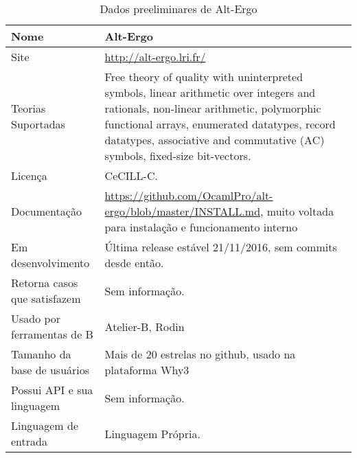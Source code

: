 \begin{table}[!h]
  \centering
  \begin{tabular}{ | l | p{10cm} |}
    \hline
	Nome & Alt-Ergo \\ \hline
    Site & \url{http://alt-ergo.lri.fr/} \\ \hline 
    Teorias Suportadas & Free theory of quality with uninterpreted symbols, linear arithmetic over integers and rationals, non-linear arithmetic, polymorphic functional arrays, enumerated datatypes, record datatypes, associative and commutative (AC) symbols, fixed-size bit-vectors.\\ \hline
    Licença & CeCILL-C. \\ \hline
    Documentação & \url{https://github.com/OcamlPro/alt-ergo/blob/master/INSTALL.md}, muito voltada para instalação e funcionamento interno \\ \hline
    Em desenvolvimento & Última release estável 21/11/2016, sem commits desde então. \\ \hline
    Retorna casos que satisfazem & Sem informação. \\ \hline
    Usado por ferramentas de B & Atelier-B, Rodin \\ \hline
    Tamanho da base de usuários & Mais de 20 estrelas no github, usado na plataforma Why3 \\ \hline
    Possui API e sua linguagem & Sem informação. \\ \hline
    Linguagem de entrada & Linguagem Própria. \\ \hline
  \end{tabular}
  \caption{Dados preeliminares de Alt-Ergo }
  \label{tab:LABEL_TAB_2}
\end{table}

